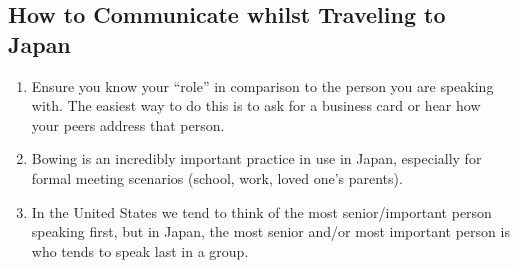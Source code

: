 \documentclass[stu,12pt]{apa7}
\begin{document}
    \subsection{How to Communicate whilst Traveling to Japan}
      \begin{enumerate}
        \item Ensure you know your ``role'' in comparison to the person you
          are speaking with. The easiest way to do this is to ask for a
          business card or hear how your peers address that person.
        \item Bowing is an incredibly important practice in use in Japan,
          especially for formal meeting scenarios (school, work, loved one's
          parents).
        \item In the United States we tend to think of the most senior/important
          person speaking first, but in Japan, the most senior and/or most
          important person is who tends to speak last in a group.
      \end{enumerate}




  \newpage
  \printbibliography[%
    title={References},%
    heading={bibintoc},%
    notcategory={consulted}%
  ]

  \newpage
  \nocite{*}
  \printbibliography[%
    title={Additional References},%
    heading={bibintoc},%
    category={consulted}%
  ]
\end{document}
